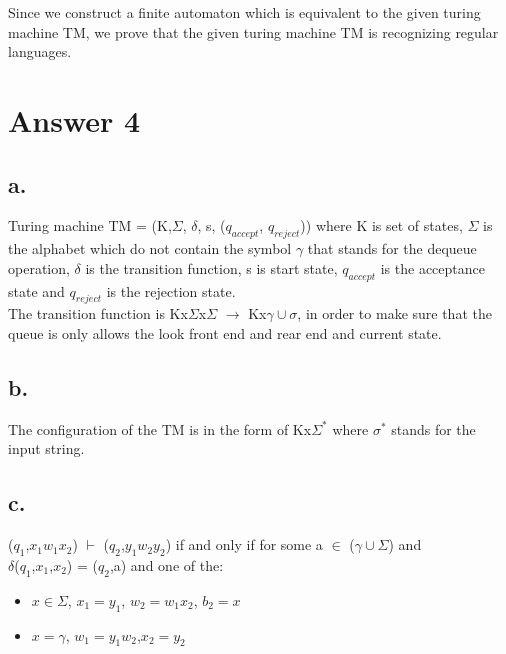 \documentclass[12pt]{article}
\begin{document}
Since we construct a finite automaton which is equivalent to the given turing machine TM, we prove that the given turing machine TM is recognizing regular languages.


\section*{Answer 4}

\subsection*{a.}
Turing machine TM = (K,$\Sigma$, $\delta$, s, ($q_{accept}$, $q_{reject}$)) where K is set of states, $\Sigma$ is the alphabet which do not contain the symbol $\gamma$ that stands for the dequeue operation, $\delta$ is the transition function, s is start state, $q_{accept}$ is the acceptance state and $q_{reject}$ is the rejection state. \\
The transition function is Kx$\Sigma$x$\Sigma$ $\rightarrow$ Kx$\gamma \cup \sigma$, in order to make sure that the queue is only allows the look front end and rear end and current state.

\subsection*{b.}
The configuration of the TM is in the form of Kx$\Sigma^*$ where $\sigma^*$ stands for the input string.
\subsection*{c.}
($q_1$,$x_1w_1x_2$) $\vdash$ ($q_2$,$y_1w_2y_2$) if and only if for some a $\in$ ($\gamma \cup \Sigma$) and \\
$\delta$($q_1$,$x_1$,$x_2$) = ($q_2$,a) and one of the:\\
\begin{itemize}
	\item $x \in \Sigma$, $x_1 = y_1$, $w_2 = w_1x_2$, $b_2=x$
	\item $x = \gamma$, $w_1=y_1w_2$,$x_2=y_2$
\end{itemize}
\end{document}
